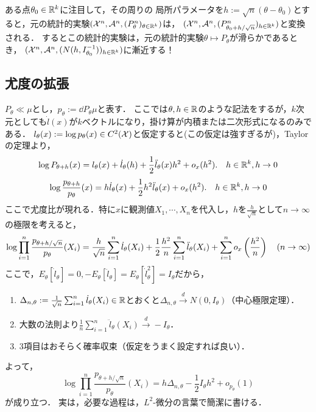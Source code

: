 \documentclass[uplatex,dvipdfmx]{jsreport}
\begin{document}
\begin{discussion}
    ある点$\theta_0\in\mathbb{R}^k$に注目して，その周りの
    局所パラメータを$h:=\sqrt{n}(\theta-\theta_0)$とすると，元の統計的実験$(\mathcal{X}^n,\mathcal{A}^n,(P_\theta^n)_{\theta\in\mathbb{R}^k})$は，
    $(\mathcal{X}^n,\mathcal{A}^n,(P^n_{\theta_0+h/\sqrt{n}})_{h\in\mathbb{R}^k})$と変換される．
    するとこの統計的実験は，元の統計的実験$\theta\mapsto P_\theta$が滑らかであるとき，
    $(\mathcal{X}^n,\mathcal{A}^n,(N(h,I_{\theta_0}^{-1}))_{h\in\mathbb{R}^k})$に漸近する！
\end{discussion}

\subsection{尤度の拡張}

\begin{discussion}
    $P_\theta\ll\mu$とし，$p_\theta:=\dd{P_\theta}{\mu}$と表す．
    ここでは$\theta,h\in\mathbb{R}$のような記法をするが，$k$次元としても$\dot{l}(x)$が$k$ベクトルになり，掛け算が内積または二次形式になるのみである．
    $l_\theta(x):=\log p_\theta(x)\in C^2(\mathcal{X})$と仮定すると(この仮定は強すぎるが)，Taylorの定理より，
    \[\log P_{\theta+h}(x)=l_\theta(x)+\dot{l}_\theta(h)+\frac{1}{2}\ddot{l}_\theta(x)h^2+o_x(h^2).\quad h\in\mathbb{R}^k,h\to0\]
    \[\log\frac{p_{\theta+h}}{p_\theta}(x)=h\dot{l}_\theta(x)+\frac{1}{2}h^2\ddot{l}_\theta(x)+o_x(h^2).\quad h\in\mathbb{R}^k,h\to0\]
    ここで尤度比が現れる．特に$x$に観測値$X_1,\cdots,X_n$を代入し，$h$を$\frac{h}{\sqrt{n}}$として$n\to\infty$の極限を考えると，
    \[\log\prod_{i=1}^n\frac{p_{\theta+h/\sqrt{n}}}{p_\theta}(X_i)=\frac{h}{\sqrt{n}}\sum^n_{i=1}\dot{l}_\theta(X_i)+\frac{1}{2}\frac{h^2}{n}\sum^n_{i=1}\ddot{l}_\theta(X_i)+\sum_{i=1}^no_x\left(\frac{h^2}{n}\right)\quad(n\to\infty)\]
    ここで，$E_\theta[\dot{l}_\theta]=0,-E_\theta[\ddot{l}_\theta]=E_\theta[\dot{l}^2_\theta]=I_\theta$だから，
    \begin{enumerate}
        \item $\Delta_{n,\theta}:=\frac{1}{\sqrt{n}}\sum^n_{i=1}\dot{l}_\theta(X_i)\in\mathbb{R}$とおくと$\Delta_{n,\theta}\xrightarrow{d}N(0,I_\theta)$（中心極限定理）．
        \item 大数の法則より$\frac{1}{n}\sum^n_{i=1}\ddot{l}_\theta(X_i)\xrightarrow{d}-I_\theta$．
        \item 3項目はおそらく確率収束（仮定をうまく設定すれば良い）．
    \end{enumerate}
    よって，
    \[\log\prod_{i=1}^n\frac{p_{\theta+h/\sqrt{n}}}{p_\theta}(X_i)=h\Delta_{n,\theta}-\frac{1}{2}I_\theta h^2+o_{p_\theta}(1)\]
    が成り立つ．
    実は，必要な過程は，$L^2$-微分の言葉で簡潔に書ける．
\end{discussion}
\end{document}
